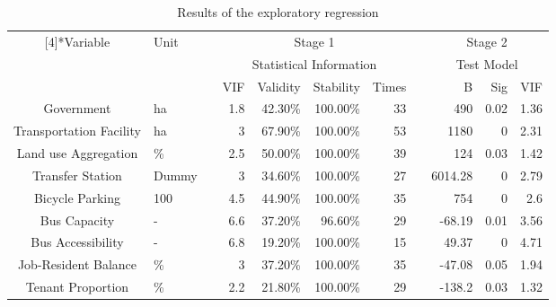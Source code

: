 \documentclass[utf8]{article}
\begin{document}
\begin{table}
	\centering
	\caption{Results of the exploratory regression}
	\label{tab:ExploratoryRegression}%
	
	\begin{tabular}{clrrrrrcrrr}
		\Xhline{1.5pt}
		
		\multirow{3}[4]{*}{Variable} & \multirow{3}[4]{*}{Unit} & & \multicolumn{4}{c}{Stage 1} & & \multicolumn{3}{c}{Stage 2} \\
		
		& & & \multicolumn{4}{c}{Statistical Information} & & \multicolumn{3}{c}{Test Model} \\
		
		\cmidrule{4-7} \cmidrule{9-11}
		
		& & & VIF & Validity & Stability & Times & & B & Sig & VIF \\
		
		\cmidrule{1-2}\cmidrule{4-7}\cmidrule{9-11}
		
		Government & ha & & 1.8 & 42.30\% & 100.00\% & 33 & & 490 & 0.02  & 1.36 \\
		Transportation Facility & ha & & 3 & 67.90\% & 100.00\% & 53 & & 1180 & 0 & 2.31 \\
		
		Land use Aggregation & \% & & 2.5 & 50.00\% & 100.00\% & 39 & & 124 & 0.03 & 1.42 \\
		
		Transfer Station & Dummy & & 3 & 34.60\% & 100.00\% & 27 & & 6014.28 & 0 & 2.79 \\
		
		Bicycle Parking & 100 & & 4.5 & 44.90\% & 100.00\% & 35 & & 754 & 0 & 2.6 \\
		
		Bus Capacity & - & & 6.6 & 37.20\% & 96.60\% & 29 & & -68.19 & 0.01 & 3.56 \\
		
		Bus Accessibility & - & & 6.8 & 19.20\% & 100.00\% & 15 & & 49.37 & 0 & 4.71 \\
		
		Job-Resident Balance & \% & & 3 & 37.20\% & 100.00\% & 35 & & -47.08 & 0.05  & 1.94 \\
		
		Tenant Proportion & \% & & 2.2 & 21.80\% & 100.00\% & 29 & & -138.2 & 0.03  & 1.32 \\
		

\end{tabular}
\end{table}
\end{document}
